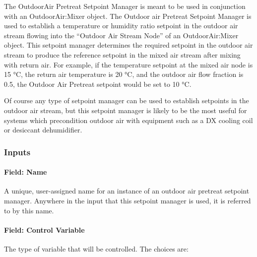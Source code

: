 The OutdoorAir Pretreat Setpoint Manager is meant to be used in conjunction with an OutdoorAir:Mixer object. The Outdoor air Pretreat Setpoint Manager is used to establish a temperature or humidity ratio setpoint in the outdoor air stream flowing into the ``Outdoor Air Stream Node'' of an OutdoorAir:Mixer object. This setpoint manager determines the required setpoint in the outdoor air stream to produce the reference setpoint in the mixed air stream after mixing with return air. For example, if the temperature setpoint at the mixed air node is 15 °C, the return air temperature is 20 °C, and the outdoor air flow fraction is 0.5, the Outdoor Air Pretreat setpoint would be set to 10 °C.

Of course any type of setpoint manager can be used to establish setpoints in the outdoor air stream, but this setpoint manager is likely to be the most useful for systems which precondition outdoor air with equipment such as a DX cooling coil or desiccant dehumidifier.

\subsubsection{Inputs}\label{inputs-9-020}

\paragraph{Field: Name}\label{field-name-9-016}

A unique, user-assigned name for an instance of an outdoor air pretreat setpoint manager. Anywhere in the input that this setpoint manager is used, it is referred to by this name.

\paragraph{Field: Control Variable}\label{field-control-variable-9}

The type of variable that will be controlled. The choices are:

